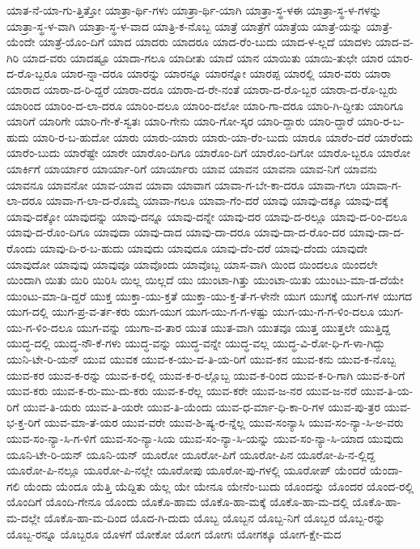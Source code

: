 {ಯಾತ-ನೆ-ಯಾ-ಗು-ತ್ತಿತ್ತೋ
ಯಾತ್ರಾ-ರ್ಥಿ-ಗಳು
ಯಾತ್ರಾ-ರ್ಥಿ-ಯಾಗಿ
ಯಾತ್ರಾ-ಸ್ಥ-ಳಈ
ಯಾತ್ರಾ-ಸ್ಥ-ಳ-ಗಳನ್ನು
ಯಾತ್ರಾ-ಸ್ಥ-ಳ-ವಾಗಿ
ಯಾತ್ರಾ-ಸ್ಥ-ಳ-ವಾದ
ಯಾತ್ರಿ-ಕ-ನೊಬ್ಬ
ಯಾತ್ರೆ
ಯಾತ್ರೆಗೆ
ಯಾತ್ರೆಯ
ಯಾತ್ರೆ-ಯನ್ನು
ಯಾತ್ರೆ-ಯೆಂದೇ
ಯಾತ್ರೆ-ಯೊಂ-ದಿಗೆ
ಯಾದ
ಯಾದರು
ಯಾದರೂ
ಯಾದ-ರೆಂ-ಬುದು
ಯಾದ-ಳ-ಲ್ಲದೆ
ಯಾದಳು
ಯಾದ-ವ-ಗಿರಿ
ಯಾದ-ವರು
ಯಾದಷ್ಟೂ
ಯಾದಾ-ಗಲೂ
ಯಾದೀತು
ಯಾದೆ
ಯಾನ
ಯಾಯಿತು
ಯಾಯಿ-ತುಛೇ
ಯಾರ
ಯಾರ-ದ-ರೊ-ಬ್ಬರೂ
ಯಾರ-ನ್ನಾ-ದರೂ
ಯಾರನ್ನು
ಯಾರನ್ನೂ
ಯಾರನ್ನೋ
ಯಾರಪ್ಪ
ಯಾರಲ್ಲಿ
ಯಾರ-ವರು
ಯಾರಾ
ಯಾರಾದ
ಯಾರಾ-ದ-ರಿ-ದ್ದರೆ
ಯಾರಾ-ದರೂ
ಯಾರಾ-ದ-ರೇ-ನಂತೆ
ಯಾರಾ-ದ-ರೊ-ಬ್ಬರ
ಯಾರಾ-ದ-ರೊ-ಬ್ಬರು
ಯಾರಿಂದ
ಯಾರಿಂ-ದ-ಲಾ-ದರೂ
ಯಾರಿಂ-ದಲೂ
ಯಾರಿಂ-ದಲೋ
ಯಾರಿ-ಗಾ-ದರೂ
ಯಾರಿ-ಗಿ-ದ್ದೀತು
ಯಾರಿಗೂ
ಯಾರಿಗೆ
ಯಾರಿಗೇ
ಯಾರಿ-ಗೇ-ಕೆ-ಸ್ವತಃ
ಯಾರಿ-ಗೇನು
ಯಾರಿ-ಗೋ-ಸ್ಕರ
ಯಾರಿ-ದ್ದಾರು
ಯಾರಿ-ದ್ದಾರೆ
ಯಾರಿ-ರ-ಬ-ಹುದು
ಯಾರಿ-ರ-ಬ-ಹುದೋ
ಯಾರು
ಯಾರು-ಯಾರು
ಯಾರು-ಯಾ-ರೆಂ-ಬುದು
ಯಾರೂ
ಯಾರೆಂ-ದರೆ
ಯಾರೆಂದು
ಯಾರೆಂ-ಬುದು
ಯಾರೆಷ್ಟೇ
ಯಾರೇ
ಯಾರೊಂ-ದಿಗೂ
ಯಾರೊಂ-ದಿಗೆ
ಯಾರೊಂ-ದಿಗೋ
ಯಾರೊ-ಬ್ಬರೂ
ಯಾರೋ
ಯಾರ್ಕಿಗೆ
ಯಾರ್ಯಾರ
ಯಾರ್ಯಾ-ರಿಗೆ
ಯಾರ್ಯಾರು
ಯಾವ
ಯಾವನ
ಯಾವನಾ
ಯಾವ-ನಿಗೆ
ಯಾವನು
ಯಾವನೂ
ಯಾವನೋ
ಯಾವ-ಯಾವ
ಯಾವಾ
ಯಾವಾಗ
ಯಾವಾ-ಗ-ಬೇ-ಕಾ-ದರೂ
ಯಾವಾ-ಗಲಾ
ಯಾವಾ-ಗ-ಲಾ-ದರೂ
ಯಾವಾ-ಗ-ಲಾ-ದ-ರೊಮ್ಮೆ
ಯಾವಾ-ಗಲೂ
ಯಾವಾ-ಗೆಂ-ದರೆ
ಯಾವು
ಯಾವು-ದಕ್ಕೂ
ಯಾವು-ದಕ್ಕೆ
ಯಾವು-ದಕ್ಕೋ
ಯಾವುದನ್ನು
ಯಾವು-ದನ್ನೂ
ಯಾವು-ದನ್ನೇ
ಯಾವು-ದರ
ಯಾವು-ದ-ರಲ್ಲೂ
ಯಾವು-ದ-ರಿಂ-ದಲೂ
ಯಾವು-ದ-ರೊಂ-ದಿಗೂ
ಯಾವುದಾ
ಯಾವು-ದಾದ
ಯಾವು-ದಾ-ದರೂ
ಯಾವು-ದಾ-ದ-ರೊಂ-ದರ
ಯಾವು-ದಾ-ದ-ರೊಂದು
ಯಾವು-ದಿ-ರ-ಬ-ಹುದು
ಯಾವುದು
ಯಾವುದೂ
ಯಾವು-ದೆಂ-ದರೆ
ಯಾವು-ದೆಂದು
ಯಾವುದೇ
ಯಾವುದೋ
ಯಾವುವು
ಯಾವುವೂ
ಯಾವೊಂದು
ಯಾವೊಬ್ಬ
ಯಾಸ-ವಾಗಿ
ಯಿಂದ
ಯಿಂದಲೂ
ಯಿಂದಲೇ
ಯಿಂದಾಗಿ
ಯಿತು
ಯಿರಿ
ಯಿರಿಸಿ
ಯಿಲ್ಲ
ಯಿಲ್ಲದೆ
ಯು
ಯುಂಟಾ-ಗಿತ್ತು
ಯುಂಟಾ-ಯಿತು
ಯುಂಟು-ಮಾ-ಡ-ದೆಯೇ
ಯುಂಟು-ಮಾ-ಡಿ-ದ್ದರೆ
ಯುಕ್ತ
ಯುಕ್ತಾ-ಯು-ಕ್ತತೆ
ಯುಕ್ತಾ-ಯು-ಕ್ತ-ತೆ-ಗ-ಳೇನೇ
ಯುಗ
ಯುಗಕ್ಕೆ
ಯುಗ-ಗಳ
ಯುಗದ
ಯುಗ-ದಲ್ಲಿ
ಯುಗ-ಪ್ರ-ವ-ರ್ತ-ಕರು
ಯುಗ-ಯುಗ
ಯುಗ-ಯು-ಗ-ಗ-ಳಷ್ಟು
ಯುಗ-ಯು-ಗ-ಗ-ಳಿಂ-ದಲೂ
ಯುಗ-ಯು-ಗ-ಳಿಂ-ದಲೂ
ಯುಗ-ವನ್ನು
ಯುಗಾ-ವ-ತಾರ
ಯುತ
ಯುತ-ವಾಗಿ
ಯುತವೂ
ಯುತ್ತ
ಯುತ್ತಲೇ
ಯುತ್ತಿದ್ದ
ಯುದ್ಧ-ದಲ್ಲಿ
ಯುದ್ಧ-ನೌ-ಕೆ-ಗಳು
ಯುದ್ಧ-ವನ್ನು
ಯುದ್ಧ-ವನ್ನೇ
ಯುದ್ಧ-ವಲ್ಲ
ಯುದ್ಧ-ವಿ-ರೋ-ಧಿ-ಗ-ಳಾ-ಗಿದ್ದು
ಯುನಿ-ಟೇ-ರಿ-ಯನ್
ಯುವ
ಯುವಕ
ಯುವ-ಕ-ಯು-ವ-ತಿ-ಯ-ರಿಗೆ
ಯುವ-ಕನ
ಯುವ-ಕನು
ಯುವ-ಕ-ನೊಬ್ಬ
ಯುವ-ಕರ
ಯುವ-ಕ-ರನ್ನು
ಯುವ-ಕ-ರಲ್ಲಿ
ಯುವ-ಕ-ರ-ಲ್ಲೊಬ್ಬ
ಯುವ-ಕ-ರಿಂದ
ಯುವ-ಕ-ರಿ-ಗಾಗಿ
ಯುವ-ಕ-ರಿಗೆ
ಯುವ-ಕರು
ಯುವ-ಕ-ರು-ಮು-ದು-ಕರು
ಯುವ-ಕ-ರೆಲ್ಲ
ಯುವ-ಕರೇ
ಯುವ-ಜ-ನರ
ಯುವ-ಜ-ನರೆ
ಯುವ-ತಿ-ಯ-ರಿಗೆ
ಯುವ-ತಿ-ಯರು
ಯುವ-ತಿ-ಯರೇ
ಯುವ-ತಿ-ಯೆಂದು
ಯುವ-ಧ-ರ್ಮಾ-ಧಿ-ಕಾ-ರಿ-ಗಳ
ಯುವ-ಪು-ತ್ರರ
ಯುವ-ಭ-ಕ್ತ-ರಿಗೆ
ಯುವ-ಮಾ-ತೆ-ಯರ
ಯುವ-ವರೇ
ಯುವ-ಶಿ-ಷ್ಯ-ರ-ನ್ನೆಲ್ಲ
ಯುವ-ಸಂನ್ಯಾಸಿ
ಯುವ-ಸಂ-ನ್ಯಾ-ಸಿ-ಅ-ವರು
ಯುವ-ಸಂ-ನ್ಯಾ-ಸಿ-ಗ-ಳಿಗೆ
ಯುವ-ಸಂ-ನ್ಯಾ-ಸಿಯ
ಯುವ-ಸಂ-ನ್ಯಾ-ಸಿ-ಯನ್ನು
ಯುವ-ಸಂ-ನ್ಯಾ-ಸಿ-ಯಾದ
ಯುವುದು
ಯೂನಿ-ಟೇ-ರಿ-ಯನ್
ಯೂನಿ-ಯನ್
ಯೂರೋ
ಯೂರೋ-ಪಿಗೆ
ಯೂರೋ-ಪಿನ
ಯೂರೋ-ಪಿ-ನ-ಲ್ಲಿದ್ದ
ಯೂರೋ-ಪಿ-ನಲ್ಲೂ
ಯೂರೋ-ಪಿ-ನಲ್ಲೇ
ಯೂರೋಪು
ಯೂರೋ-ಪು-ಗಳಲ್ಲಿ
ಯೂರೋಪ್
ಯೆಂದರೆ
ಯೆಂದಾ-ಗಲಿ
ಯೆಂದು
ಯೆಂದೂ
ಯೆತ್ತಿ
ಯೆದ್ದಿತು
ಯೆಲ್ಲ
ಯೇ
ಯೇನೂ
ಯೇನೆಂ-ಬುದು
ಯೊಂದನ್ನು
ಯೊಂದರ
ಯೊಂದ-ರಲ್ಲಿ
ಯೊಂದಿಗೆ
ಯೊಂದಿ-ಗೇನೂ
ಯೊಂದು
ಯೊಕೊ-ಹಾಮ
ಯೊಕೊ-ಹಾ-ಮಕ್ಕೆ
ಯೊಕೊ-ಹಾ-ಮ-ದಲ್ಲಿ
ಯೊಕೊ-ಹಾ-ಮ-ದಲ್ಲೇ
ಯೊಕೊ-ಹಾ-ಮ-ದಿಂದ
ಯೊದ-ಗಿ-ದುದು
ಯೊಬ್ಬ
ಯೊಬ್ಬನ
ಯೊಬ್ಬ-ನಿಗೆ
ಯೊಬ್ಬರ
ಯೊಬ್ಬ-ರನ್ನು
ಯೊಬ್ಬ-ರನ್ನೂ
ಯೊಬ್ಬರೂ
ಯೊಳಗೆ
ಯೋಕೋ
ಯೋಗ
ಯೋಗಃ
ಯೋಗಕ್ಕೂ
ಯೋಗ-ಕ್ಷೇ-ಮದ
}
